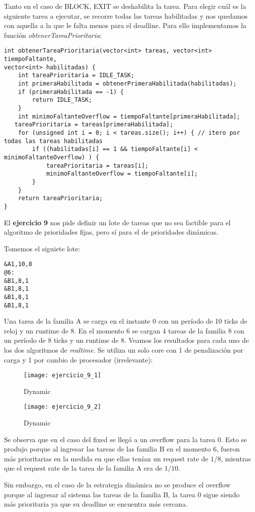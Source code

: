Tanto en el caso de BLOCK, EXIT se deshabilita la tarea. Para elegir cu\'al es la siguiente tarea a ejecutar, se recorre todas las tareas habilitadas y nos quedamos con aquella a la que le falta menos para el deadline. Para ello implementamos  la funci\'on \textit{obtenerTareaPrioritaria}:

\begin{verbatim}
int obtenerTareaPrioritaria(vector<int> tareas, vector<int> tiempoFaltante,
vector<int> habilitadas) {
    int tareaPrioritaria = IDLE_TASK;
    int primeraHabilitada = obtenerPrimeraHabilitada(habilitadas);
    if (primeraHabilitada == -1) {
        return IDLE_TASK;
    }
    int minimoFaltanteOverflow = tiempoFaltante[primeraHabilitada];
   tareaPrioritaria = tareas[primeraHabilitada];
    for (unsigned int i = 0; i < tareas.size(); i++) { // itero por todas las tareas habilitadas
        if ((habilitadas[i] == 1 && tiempoFaltante[i] < minimoFaltanteOverflow) ) {
            tareaPrioritaria = tareas[i];
            minimoFaltanteOverflow = tiempoFaltante[i];
        }
    }
    return tareaPrioritaria;	
} 

\end{verbatim}

El \textbf{ejercicio 9} nos pide definir un lote de tareas que no sea factible para el algoritmo de prioridades fijas, pero s\'i para el de prioridades din\'amicas. 

Tomemos el siguiete lote:

\begin{verbatim}
&A1,10,8
@6:
&B1,8,1
&B1,8,1
&B1,8,1
&B1,8,1
\end{verbatim}

Una tarea de la familia A se carga en el instante 0 con un per\'iodo de 10 ticks de reloj y un runtime de 8. En el momento 6 se cargan 4 tareas de la familia 8 con un per\'iodo de 8 ticks y un runtime de 8. Veamos los resultados para cada uno de los dos algoritmos de \textit{realtime}. Se utiliza un solo core con 1 de penalizaci\'on por carga y 1 por cambio de procesador (irrelevante):

\begin{figure}[H]
\caption{Dynamic}
\texttt{[image: ejercicio\_9\_1]}
\end{figure}

\begin{figure}[H]
\caption{Dynamic}
\texttt{[image: ejercicio\_9\_2]}
\end{figure}

Se observa que en el caso del fixed se lleg\'o a un overflow para la tarea 0. Esto se produjo porque al ingresar las tareas de las familia B en el momento 6, fueron m\'as prioritarias en la medida en que ellas ten\'ian un request rate de $1/8$, mientras que el request rate de la tarea de la familia A era de $1/10$. 

Sin embargo, en el caso de la estrategia din\'amica no se produce el overflow porque al ingresar al sistema las tareas de la familia B, la tarea 0 sigue siendo m\'as prioritaria ya que su deadline se encuentra m\'as cercana.